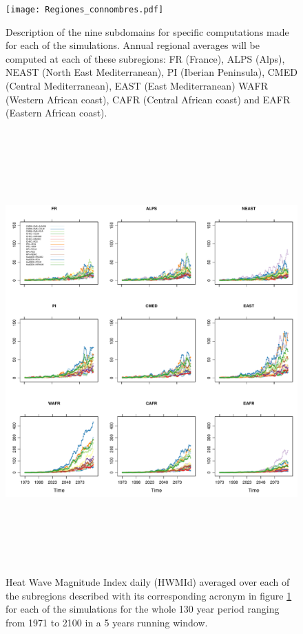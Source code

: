 \newpage
\begin{figure}
\texttt{[image: Regiones\_connombres.pdf]}
\caption{Description of the nine subdomains for specific computations
made for each of the simulations. Annual regional averages will be
computed at each of these subregions: FR (France), ALPS (Alps), NEAST (North East Mediterranean), PI (Iberian Peninsula), CMED (Central Mediterranean), EAST (East Mediterranean)
WAFR (Western African coast), CAFR (Central African coast) and EAFR (Eastern African coast).}
\label{figRegiones}       %
\end{figure}
\newpage
\begin{figure}
\includegraphics[height=17.0cm]{printseriesHWMId}
\caption{Heat Wave Magnitude Index daily (HWMId)
averaged over each of the subregions described with its
corresponding acronym in figure \ref{figRegiones}
for each of the simulations for the whole 130 year period
ranging from 1971 to 2100 in a 5 years running window.}
\label{figseriesHWMId}
\end{figure}

